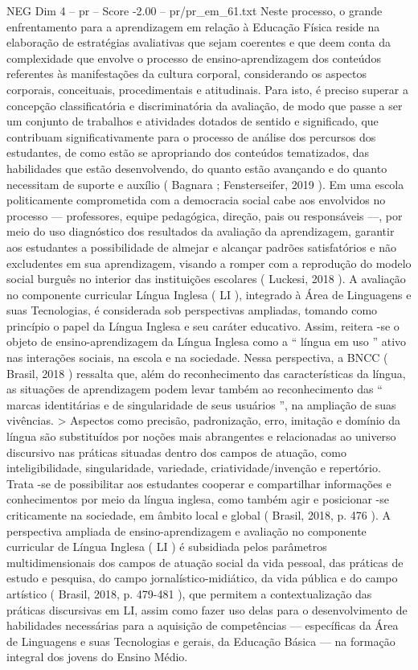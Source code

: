 \begin{textsample}{NEG Dim 4 – pr – Score -2.00 – pr/pr\_em\_61.txt}
Neste processo, o grande enfrentamento para a aprendizagem em relação à Educação Física reside na elaboração de estratégias avaliativas que sejam coerentes e que deem conta da complexidade que envolve o processo de ensino-aprendizagem dos conteúdos referentes às manifestações da cultura corporal, considerando os aspectos corporais, conceituais, procedimentais e atitudinais.
Para isto, é preciso superar a concepção classificatória e discriminatória da avaliação, de modo que passe a ser um conjunto de trabalhos e atividades dotados de sentido e significado, que contribuam significativamente para o processo de análise dos percursos dos estudantes, de como estão se apropriando dos conteúdos tematizados, das habilidades que estão desenvolvendo, do quanto estão avançando e do quanto necessitam de suporte e auxílio ( Bagnara ; Fensterseifer, 2019 ).
Em uma escola politicamente comprometida com a democracia social cabe aos envolvidos no processo — professores, equipe pedagógica, direção, pais ou responsáveis —, por meio do uso diagnóstico dos resultados da avaliação da aprendizagem, garantir aos estudantes a possibilidade de almejar e alcançar padrões satisfatórios e não excludentes em sua aprendizagem, visando a romper com a reprodução do modelo social burguês no interior das instituições escolares ( Luckesi, 2018 ).
A avaliação no componente curricular Língua Inglesa ( LI ), integrado à Área de Linguagens e suas Tecnologias, é considerada sob perspectivas ampliadas, tomando como princípio o papel da Língua Inglesa e seu caráter educativo.
Assim, reitera -se o objeto de ensino-aprendizagem da Língua Inglesa como a “ língua em uso ” ativo nas interações sociais, na escola e na sociedade.
Nessa perspectiva, a BNCC ( Brasil, 2018 ) ressalta que, além do reconhecimento das características da língua, as situações de aprendizagem podem levar também ao reconhecimento das “ marcas identitárias e de singularidade de seus usuários ”, na ampliação de suas vivências. > Aspectos como precisão, padronização, erro, imitação e domínio da língua são substituídos por noções mais abrangentes e relacionadas ao universo discursivo nas práticas situadas dentro dos campos de atuação, como inteligibilidade, singularidade, variedade, criatividade/invenção e repertório.
Trata -se de possibilitar aos estudantes cooperar e compartilhar informações e conhecimentos por meio da língua inglesa, como também agir e posicionar -se criticamente na sociedade, em âmbito local e global ( Brasil, 2018, p. 476 ).
A perspectiva ampliada de ensino-aprendizagem e avaliação no componente curricular de Língua Inglesa ( LI ) é subsidiada pelos parâmetros multidimensionais dos campos de atuação social da vida pessoal, das práticas de estudo e pesquisa, do campo jornalístico-midiático, da vida pública e do campo artístico ( Brasil, 2018, p. 479-481 ), que permitem a contextualização das práticas discursivas em LI, assim como fazer uso delas para o desenvolvimento de habilidades necessárias para a aquisição de competências — específicas da Área de Linguagens e suas Tecnologias e gerais, da Educação Básica — na formação integral dos jovens do Ensino Médio.

\end{textsample}
